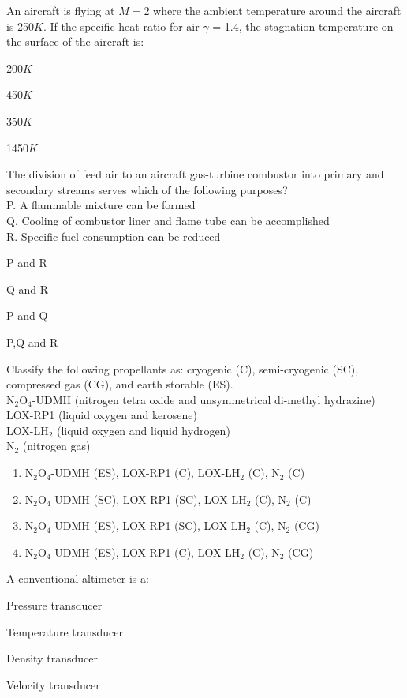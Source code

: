 \item An aircraft is flying at $M = 2$ where the ambient temperature around the aircraft is 250$K$. If the specific heat ratio for air $\gamma$ = 1.4, the stagnation temperature on the surface of the aircraft is:
\begin{enumerate}
\begin{multicols}{4}
\item 200$K$
\item 450$K$
\item 350$K$
\item 1450$K$
\end{multicols}
\end{enumerate}
\item The division of feed air to an aircraft gas-turbine combustor into primary and secondary streams serves which of the following purposes?\\
P. A flammable mixture can be formed\\
Q. Cooling of combustor liner and flame tube can be accomplished\\
R. Specific fuel consumption can be reduced
\begin{enumerate}
\begin{multicols}{4}
\item P and R
\item Q and R
\item P and Q
\item P,Q and R
\end{multicols}
\end{enumerate}
\item Classify the following propellants as: cryogenic (C), semi-cryogenic (SC), compressed gas (CG), and earth storable (ES).\\
N$_2$O$_4$-UDMH (nitrogen tetra oxide and unsymmetrical di-methyl hydrazine)\\
LOX-RP1 (liquid oxygen and kerosene)\\
LOX-LH$_2$ (liquid oxygen and liquid hydrogen)\\
N$_2$ (nitrogen gas)\\
\begin{enumerate}
\item N$_2$O$_4$-UDMH (ES), LOX-RP1 (C), LOX-LH$_2$ (C), N$_2$ (C)
\item N$_2$O$_4$-UDMH (SC), LOX-RP1 (SC), LOX-LH$_2$ (C), N$_2$ (C)
\item N$_2$O$_4$-UDMH (ES), LOX-RP1 (SC), LOX-LH$_2$ (C), N$_2$ (CG)
\item N$_2$O$_4$-UDMH (ES), LOX-RP1 (C), LOX-LH$_2$ (C), N$_2$ (CG)
\end{enumerate}
\item A conventional altimeter is a:
\begin{enumerate}
\begin{multicols}{2}
\item Pressure transducer
\item Temperature transducer
\item Density transducer
\item Velocity transducer
\end{multicols}
\end{enumerate}
